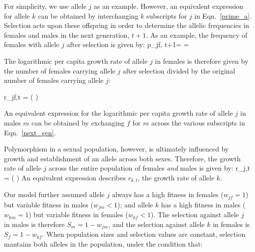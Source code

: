 \documentclass[12pt]{article}
\let\oldequation\equation
\let\oldendequation\endequation
\renewenvironment{equation}
  {\linenomathNonumbers\oldequation}
  {\oldendequation\endlinenomath}
\begin{document}
For simplicity, we use allele $j$ as an example. However, an equivalent expression for allele $k$ can be obtained by interchanging $k$ subscripts for $j$ in Eqn.~\ref{prime_a}. Selection acts upon these offspring in order to determine the allelic frequencies in females and males in the next generation, $t+1$. As an example, the frequency  of females with allele $j$ after selection is given by:
\begin{equation}
   p_{jf, t+1}=  = 
   \label{next_gen}
\end{equation}

The logarithmic per capita growth rate of allele $j$ in females is therefore given by the number of females carrying allele $j$ after selection divided by the original number of females carrying allele $j$:

\begin{equation}
    r_{jf,t} = \ln \left(  \right)
    \label{canonical}
\end{equation}

An equivalent expression for the logarithmic per capita growth rate of allele $j$ in males $m$ can be obtained by exchanging $f$ for $m$ across the various subscripts in Eqn.~\ref{next_gen}.

Polymorphism in a sexual population, however, is ultimately influenced by growth and establishment of an allele across both sexes. Therefore, the growth rate of allele $j$ across the entire population of females \emph{and} males is given by:
\begin{equation}
    r_{j,t} = \ln \left(   \right)
    \label{full}
\end{equation}
An equivalent expression describes $r_{k,t}$, the growth rate of allele $k$.


Our model further assumed allele $j$ always has a high fitness in females ($w_{jf} = 1$) but variable fitness in males ($w_{jm} < 1$); and allele $k$ has a high fitness in males ($w_{km} = 1$)  but variable fitness in females ($w_{kf} < 1 $). The selection against allele $j$ in males is therefore $S_{m}= 1 - w_{jm}$, and the selection against allele $k$ in females is $S_{f}= 1 - w_{kf}$. When population sizes and selection values are constant,
selection mantains both alleles in the population, under the condition that:
\end{document}
